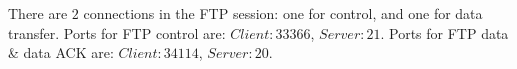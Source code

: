 There are $2$ connections in the FTP session: one for control, and one for data transfer.
Ports for FTP control are: $Client: 33366$, $Server: 21$.
Ports for FTP data & data ACK are: $Client: 34114$, $Server: 20$.